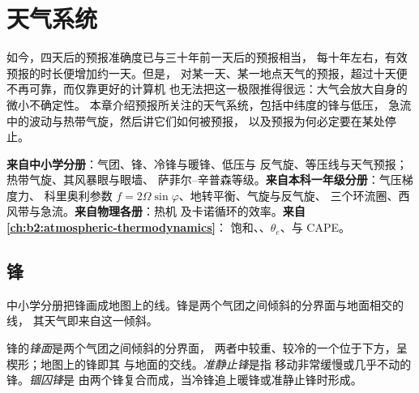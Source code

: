 \chapter{天气系统}\label{ch:b2:weather-systems}

如今，四天后的预报准确度已与三十年前一天后的预报相当，
每十年左右，有效预报的时长便增加约一天。但是，
对某一天、某一地点天气的预报，超过十天便不再可靠，而仅靠更好的计算机
也无法把这一极限推得很远：大气会放大自身的微小不确定性。
本章介绍预报所关注的天气系统，包括中纬度的锋与低压，
急流中的波动与热带气旋，然后讲它们如何被预报，
以及预报为何必定要在某处停止。

\begin{recall}
\textbf{来自中小学分册}：气团、锋、冷锋与暖锋、低压与
反气旋、等压线与天气预报；热带气旋、其风暴眼与眼墙、
萨菲尔–辛普森等级。\textbf{来自本科一年级分册}：气压梯度力、
科里奥利参数 $f = 2\Omega\sin\varphi$、地转平衡、气旋与反气旋、
三个环流圈、西风带与急流。\textbf{来自物理各册}：热机
及卡诺循环的效率。\textbf{来自\cref{ch:b2:atmospheric-thermodynamics}}：
饱和、、$\theta_e$、与 CAPE。
\end{recall}

\section{锋}\label{sec:b2:weather-systems:fronts}

中小学分册把锋画成地图上的线。锋是两个气团之间倾斜的分界面与地面相交的线，
其天气即来自这一倾斜。

\begin{definition}\label{def:b2:weather-systems:fronts}
锋的\emph{锋面}是两个气团之间倾斜的分界面，
两者中较重、较冷的一个位于下方，呈楔形；地图上的锋即其
与地面的交线。\emph{准静止锋}是指
移动非常缓慢或几乎不动的锋。\emph{锢囚锋}是
由两个锋复合而成，当冷锋追上暖锋或准静止锋时形成。
\end{definition}

